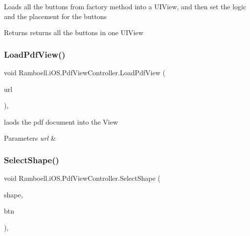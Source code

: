 Loads all the buttons from factory method into a U\+I\+View, and then set the logic and the placement for the buttons 

\begin{DoxyReturn}{Returns}
returns all the buttons in one U\+I\+View 
\end{DoxyReturn}
\mbox{\label{class_ramboell_1_1i_o_s_1_1_pdf_view_controller_a29c0a1aafda725e0bc0d5f8d5c0ba971}} 
\subsubsection{\texorpdfstring{Load\+Pdf\+View()}{LoadPdfView()}}
{\footnotesize\ttfamily void Ramboell.\+i\+O\+S.\+Pdf\+View\+Controller.\+Load\+Pdf\+View (\begin{DoxyParamCaption}\item[{N\+S\+Url}]{url }\end{DoxyParamCaption})\hspace{0.3cm}{\ttfamily [inline]}, {\ttfamily [private]}}



laods the pdf document into the View 


\begin{DoxyParams}{Parameters}
{\em url} & \\
\hline
\end{DoxyParams}
\mbox{\label{class_ramboell_1_1i_o_s_1_1_pdf_view_controller_adcb7bc4fd260d2006f243bff72f2c7cb}} 
\subsubsection{\texorpdfstring{Select\+Shape()}{SelectShape()}}
{\footnotesize\ttfamily void Ramboell.\+i\+O\+S.\+Pdf\+View\+Controller.\+Select\+Shape (\begin{DoxyParamCaption}\item[{\hyperlink{class_ramboell_1_1i_o_s_1_1_pdf_view_controller_ae9d97ce3c5ade4517fe1191c2dd25707}{Shape}}]{shape,  }\item[{U\+I\+Button}]{btn }\end{DoxyParamCaption})\hspace{0.3cm}{\ttfamily [inline]}, {\ttfamily [private]}}



